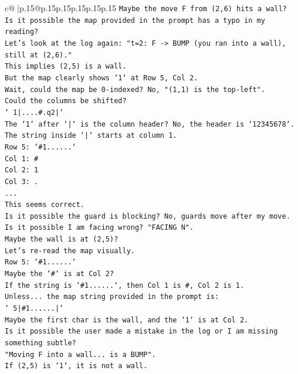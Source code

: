 \documentclass{article}
\begin{document}
{\begin{supertabular}{c@{$\;$}|p{.15\linewidth}@{}p{.15\linewidth}p{.15\linewidth}p{.15\linewidth}p{.15\linewidth}p{.15\linewidth}}
{{{\texttt{Maybe the move F from (2,6) hits a wall?} \\
\texttt{Is it possible the map provided in the prompt has a typo in my reading?} \\
\texttt{Let's look at the log again: "t=2: F {-}> BUMP (you ran into a wall), still at (2,6)."} \\
\texttt{This implies (2,5) is a wall.} \\
\texttt{But the map clearly shows `1` at Row 5, Col 2.} \\
\texttt{Wait, could the map be 0{-}indexed? No, "(1,1) is the top{-}left".} \\
\texttt{Could the columns be shifted?} \\
\texttt{` 1|....\#.q2|`} \\
\texttt{The `1` after `|` is the column header? No, the header is `12345678`.} \\
\texttt{The string inside `|` starts at column 1.} \\
\texttt{Row 5: `\#1......`} \\
\texttt{Col 1: \#} \\
\texttt{Col 2: 1} \\
\texttt{Col 3: .} \\
\texttt{...} \\
\texttt{This seems correct.} \\
\texttt{Is it possible the guard is blocking? No, guards move after my move.} \\
\texttt{Is it possible I am facing wrong? "FACING N".} \\
\texttt{Maybe the wall is at (2,5)?} \\
\texttt{Let's re{-}read the map visually.} \\
\texttt{Row 5: `\#1......`} \\
\texttt{Maybe the `\#` is at Col 2?} \\
\texttt{If the string is `\#1......`, then Col 1 is \#, Col 2 is 1.} \\
\texttt{Unless... the map string provided in the prompt is:} \\
\texttt{` 5|\#1......|`} \\
\texttt{Maybe the first char is the wall, and the `1` is at Col 2.} \\
\texttt{Is it possible the user made a mistake in the log or I am missing something subtle?} \\
\texttt{"Moving F into a wall... is a BUMP".} \\
\texttt{If (2,5) is `1`, it is not a wall.} \\
}}}
\end{supertabular}}
\end{document}
